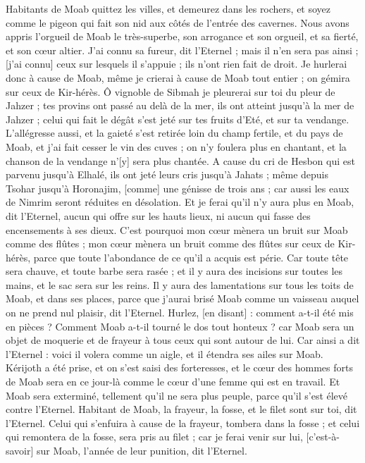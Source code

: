 \begin{multicols}{2}
Habitants de Moab quittez les villes, et demeurez dans les rochers, et soyez comme le pigeon qui fait son nid aux côtés de l'entrée des cavernes.
Nous avons appris l'orgueil de Moab le très-superbe, son arrogance et son orgueil, et sa fierté, et son cœur altier.
J'ai connu sa fureur, dit l'Eternel ; mais il n'en sera pas ainsi ; [j'ai connu] ceux sur lesquels il s'appuie ; ils n'ont rien fait de droit.
Je hurlerai donc à cause de Moab, même je crierai à cause de Moab tout entier ; on gémira sur ceux de Kir-hérès.
Ô vignoble de Sibmah je pleurerai sur toi du pleur de Jahzer ; tes provins ont passé au delà de la mer, ils ont atteint jusqu’à la mer de Jahzer ; celui qui fait le dégât s'est jeté sur tes fruits d'Eté, et sur ta vendange.
L'allégresse aussi, et la gaieté s'est retirée loin du champ fertile, et du pays de Moab, et j'ai fait cesser le vin des cuves ; on n'y foulera plus en chantant, et la chanson de la vendange n'[y] sera plus chantée.
A cause du cri de Hesbon qui est parvenu jusqu’à Elhalé, ils ont jeté leurs cris jusqu’à Jahats ; même depuis Tsohar jusqu'à Horonajim, [comme] une génisse de trois ans ; car aussi les eaux de Nimrim seront réduites en désolation.
Et je ferai qu'il n'y aura plus en Moab, dit l'Eternel, aucun qui offre sur les hauts lieux, ni aucun qui fasse des encensements à ses dieux.
C'est pourquoi mon cœur mènera un bruit sur Moab comme des flûtes ; mon cœur mènera un bruit comme des flûtes sur ceux de Kir-hérès, parce que toute l'abondance de ce qu'il a acquis est périe.
Car toute tête sera chauve, et toute barbe sera rasée ; et il y aura des incisions sur toutes les mains, et le sac sera sur les reins.
Il y aura des lamentations sur tous les toits de Moab, et dans ses places, parce que j'aurai brisé Moab comme un vaisseau auquel on ne prend nul plaisir, dit l'Eternel.
Hurlez, [en disant] : comment a-t-il été mis en pièces ? Comment Moab a-t-il tourné le dos tout honteux ? car Moab sera un objet de moquerie et de frayeur à tous ceux qui sont autour de lui.
Car ainsi a dit l'Eternel : voici il volera comme un aigle, et il étendra ses ailes sur Moab.
Kérijoth a été prise, et on s'est saisi des forteresses, et le cœur des hommes forts de Moab sera en ce jour-là comme le cœur d'une femme qui est en travail.
Et Moab sera exterminé, tellement qu'il ne sera plus peuple, parce qu'il s'est élevé contre l'Eternel.
Habitant de Moab, la frayeur, la fosse, et le filet sont sur toi, dit l'Eternel.
Celui qui s'enfuira à cause de la frayeur, tombera dans la fosse ; et celui qui remontera de la fosse, sera pris au filet ; car je ferai venir sur lui, [c'est-à-savoir] sur Moab, l'année de leur punition, dit l'Eternel.

\end{multicols}
